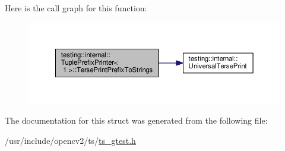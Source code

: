 Here is the call graph for this function\-:\nopagebreak
\begin{figure}[H]
\begin{center}
\leavevmode
\includegraphics[width=350pt]{structtesting_1_1internal_1_1TuplePrefixPrinter_3_011_01_4_acc513062684bbdd514a294f79a7980cc_cgraph}
\end{center}
\end{figure}




The documentation for this struct was generated from the following file\-:\begin{DoxyCompactItemize}
\item 
/usr/include/opencv2/ts/\hyperlink{ts__gtest_8h}{ts\-\_\-gtest.\-h}\end{DoxyCompactItemize}
